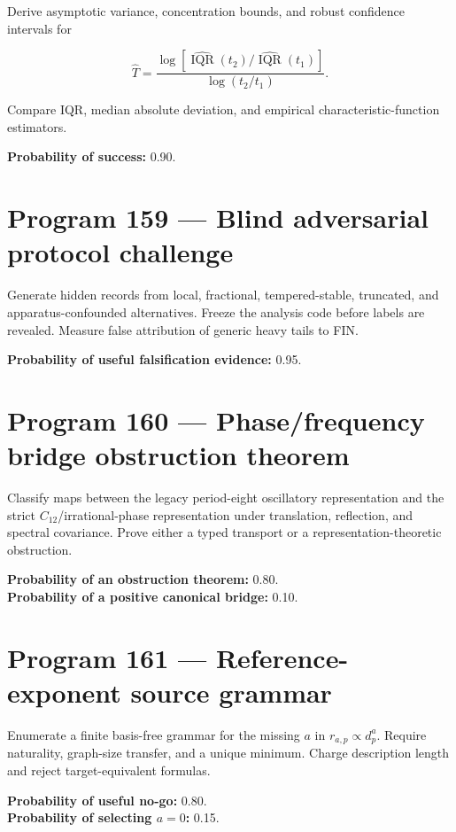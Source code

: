 \documentclass[11pt,a4paper,openany]{report}
\begin{document}
Derive asymptotic variance, concentration bounds, and robust confidence intervals for

\[
\widehat T
=
\frac{\log[\widehat{\operatorname{IQR}}(t_2)/
\widehat{\operatorname{IQR}}(t_1)]}{\log(t_2/t_1)}.
\]

Compare IQR, median absolute deviation, and empirical characteristic-function estimators.

\textbf{Probability of success:} 0.90.

\section{Program 159 --- Blind adversarial protocol challenge}

Generate hidden records from local, fractional, tempered-stable, truncated, and apparatus-confounded alternatives. Freeze the analysis code before labels are revealed. Measure false attribution of generic heavy tails to FIN.

\textbf{Probability of useful falsification evidence:} 0.95.

\section{Program 160 --- Phase/\allowbreak{}frequency bridge obstruction theorem}

Classify maps between the legacy period-eight oscillatory representation and the strict \(C_{12}\)/\allowbreak{}irrational-phase representation under translation, reflection, and spectral covariance. Prove either a typed transport or a representation-theoretic obstruction.

\textbf{Probability of an obstruction theorem:} 0.80.\\
\textbf{Probability of a positive canonical bridge:} 0.10.

\section{Program 161 --- Reference-exponent source grammar}

Enumerate a finite basis-free grammar for the missing \(a\) in \(r_{a,p}\propto d_p^a\). Require naturality, graph-size transfer, and a unique minimum. Charge description length and reject target-equivalent formulas.

\textbf{Probability of useful no-go:} 0.80.\\
\textbf{Probability of selecting \(a=0\):} 0.15.
\end{document}
